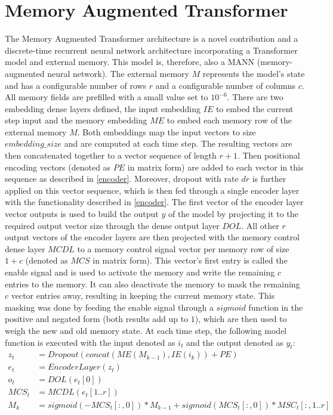 \documentclass[draft,final]{vutinfth} %
\begin{document}
\section{Memory Augmented Transformer} \label{mat}
The Memory Augmented Transformer architecture is a novel contribution and a discrete-time recurrent neural network architecture incorporating a Transformer model and external memory.
This model is, therefore, also a MANN (memory-augmented neural network).
The external memory $M$ represents the model's state and has a configurable number of rows $r$ and a configurable number of columns $c$.
All memory fields are prefilled with a small value set to $10^{-6}$.
There are two embedding dense layers defined, the input embedding $IE$ to embed the current step input and the memory embedding $ME$ to embed each memory row of the external memory $M$.
Both embeddings map the input vectors to size $embedding\_size$ and are computed at each time step. The resulting vectors are then concatenated together to a vector sequence of length $r+1$.
Then positional encoding vectors (denoted as $PE$ in matrix form) are added to each vector in this sequence as described in \ref{encoder}.
Moreover, dropout with rate $dr$ is further applied on this vector sequence, which is then fed through a single encoder layer with the functionality described in \ref{encoder}.
The first vector of the encoder layer vector outputs is used to build the output $y$ of the model by projecting it to the required output vector size through the dense output layer $DOL$.
All other $r$ output vectors of the encoder layers are then projected with the memory control dense layer $MCDL$ to a memory control signal vector per memory row of size $1 + c$ (denoted as $MCS$ in matrix form).
This vector's first entry is called the enable signal and is used to activate the memory and write the remaining $c$ entries to the memory.
It can also deactivate the memory to mask the remaining $c$ vector entries away, resulting in keeping the current memory state.
This masking was done by feeding the enable signal through a $sigmoid$ function in the positive and negated form (both results add up to $1$), which are then used to weigh the new and old memory state.
At each time step, the following model function is executed with the input denoted as $i_t$ and the output denoted as $y_t$:
\begin{align}
z_t &= Dropout(concat(ME(M_{k-1}), IE(i_k)) + PE) \\
e_t &= EncoderLayer(z_t) \\
o_t &= DOL(e_t[0]) \\
MCS_t &= MCDL(e_t[1..r]) \\
M_k &= sigmoid(-MCS_t[:,0]) * M_{k-1} + sigmoid(MCS_t[:,0]) * MSC_t[:,1..r]
\end{align}
\end{document}
